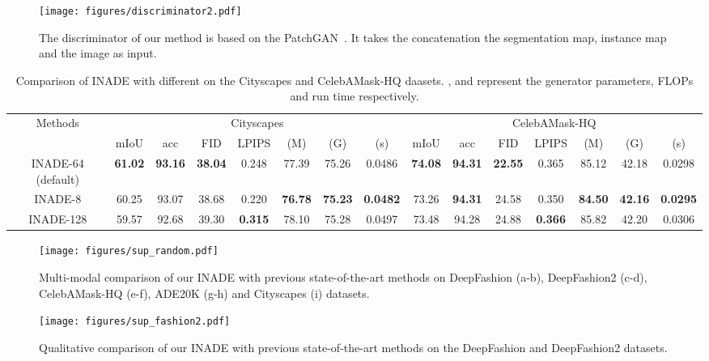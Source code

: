 \documentclass[final]{cvpr}
\begin{document}
\begin{figure}[tp]
  \centering
  \texttt{[image: figures/discriminator2.pdf]}
  \caption{The discriminator of our method is based on the PatchGAN~\cite{isola2017image}. It takes the concatenation the segmentation map, instance map and the image as input.}
  \label{fig:discriminator}
\end{figure}

\begin{table*}[t]
\setlength{\tabcolsep}{1.8mm}
    \centering
    \caption{Comparison of INADE with different  on the Cityscapes and CelebAMask-HQ daasets. ,  and  represent the generator parameters, FLOPs and run time respectively.}
\footnotesize
    \begin{tabular}{c|c|c|c|c|c|c|c|c|c|c|c|c|c|c}
    \hline
        \multirow{2}{*}{Methods} & \multicolumn{7}{c|}{Cityscapes} & \multicolumn{7}{c}{CelebAMask-HQ}\\
        \cline{2-15}
         & mIoU & acc & FID & LPIPS &  (M) &  (G) &  (s) & mIoU & acc & FID & LPIPS &  (M) &  (G) &  (s)\\
        \hline
        INADE-64 (default) & \textbf{61.02} & \textbf{93.16} & \textbf{38.04} & 0.248 & 77.39 & 75.26 & 0.0486 & \textbf{74.08} & \textbf{94.31} & \textbf{22.55} & 0.365 & 85.12 & 42.18 & 0.0298 \\
        \hline
        INADE-8 & 60.25 & 93.07 & 38.68 & 0.220 & \textbf{76.78} & \textbf{75.23} & \textbf{0.0482} & 73.26 & \textbf{94.31} & 24.58 & 0.350 & \textbf{84.50} & \textbf{42.16} & \textbf{0.0295}\\
        \hline
        INADE-128 & 59.57 & 92.68 & 39.30 & \textbf{0.315} & 78.10 & 75.28 & 0.0497 & 73.48 & 94.28 & 24.88 & \textbf{0.366} & 85.82 & 42.20 & 0.0306\\
        \hline
    \end{tabular}
    \label{tab:ablation}
\end{table*}{}


\begin{figure*}[tp]
  \centering
  \texttt{[image: figures/sup\_random.pdf]}
  \caption{Multi-modal comparison of our INADE with previous state-of-the-art methods on DeepFashion (a-b), DeepFashion2 (c-d), CelebAMask-HQ (e-f), ADE20K (g-h) and Cityscapes (i) datasets.}
  \label{fig:sup_random}
\end{figure*}

\begin{figure*}[tp]
  \centering
  \texttt{[image: figures/sup\_fashion2.pdf]}
  \caption{Qualitative comparison of our INADE with previous state-of-the-art methods on the DeepFashion and DeepFashion2 datasets.}
  \label{fig:sup_fashion}
\end{figure*}
\end{document}
